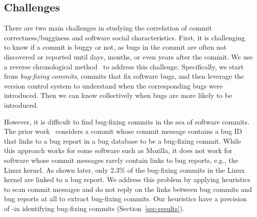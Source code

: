 \subsection{Challenges}
There are two main challenges in studying the correlation of commit correctness/bugginess and software social characteristics.
First, it is challenging to know if a commit is buggy or not,
as bugs in the commit are often not 
discovered or reported until days, months, or even years after the commit. 
We use a reverse chronological method~\cite{sliwerski-msr-2005} to address this challenge. 
Specifically, we start from {\em bug-fixing commits}, commits that fix software bugs, 
and then leverage the version control system to understand when the corresponding bugs were introduced. 
Then we can know collectively when bugs are more likely to be introduced. 

However, it is difficult to find bug-fixing commits in the sea of software commits.
The prior work~\cite{sliwerski-msr-2005} considers a commit whose commit message contains a bug 
ID that links to a bug report in a bug database to be a bug-fixing commit. While this
approach works for some software such as Mozilla, it does not work for software whose commit messages
rarely contain links to bug reports, e.g., the Linux kernel.
As shown later, only 2.3\% of the bug-fixing commits in the Linux kernel are linked to a bug report.
We address this problem by applying heuristics 
to scan commit messages and do not reply on the links between bug commits and bug reports at all to extract bug-fixing commits.
Our heuristics have a precision of \postP-\linuxP in identifying bug-fixing commits (Section~\ref{sec-results}).


